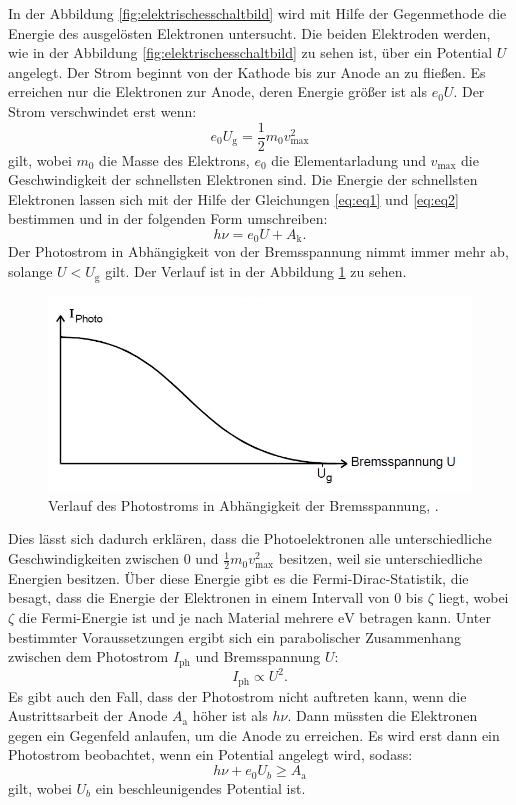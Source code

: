 In der Abbildung \ref{fig:elektrischesschaltbild} wird mit Hilfe der Gegenmethode die Energie des ausgelösten Elektronen untersucht. Die beiden Elektroden werden, wie in der Abbildung \ref{fig:elektrischesschaltbild} zu sehen ist, über ein Potential $U$ angelegt. Der Strom beginnt von der Kathode bis zur Anode an zu fließen. Es erreichen nur die Elektronen zur Anode, deren Energie größer ist als $e_0U$.
Der Strom verschwindet erst wenn:
\begin{equation}
\label{eq:eq2}
e_0U_\text{g} = \frac{1}{2}m_0v_\text{max}^2
\end{equation}
gilt, wobei $m_0$ die Masse des Elektrons, $e_0$ die Elementarladung und $v_\text{max}$ die Geschwindigkeit der schnellsten Elektronen sind. Die Energie der schnellsten Elektronen lassen sich mit der Hilfe der Gleichungen \ref{eq:eq1} und \ref{eq:eq2} bestimmen und in der folgenden Form umschreiben:
\begin{equation}
\label{eq:eq3}
h\nu = e_0U + A_\text{k}.
\end{equation}
Der Photostrom in Abhängigkeit von der Bremsspannung nimmt immer mehr ab, solange $U < U_\text{g}$ gilt. Der Verlauf ist in der Abbildung \ref{fig:photostrom} zu sehen. 
\begin{figure}[h!]
	\centering
	\includegraphics[width=0.7\linewidth]{Photostrom.jpg}
	\caption{Verlauf des Photostroms in Abhängigkeit der Bremsspannung, \cite[6]{anleitung500}.}
	\label{fig:photostrom}
\end{figure}
Dies lässt sich dadurch erklären, dass die Photoelektronen alle unterschiedliche Geschwindigkeiten zwischen $0$ und $\frac{1}{2}m_0v_\text{max}^2$ besitzen, weil sie unterschiedliche Energien besitzen. Über diese Energie gibt es die Fermi-Dirac-Statistik, die besagt, dass die Energie der Elektronen in einem Intervall von $0$ bis $\zeta$ liegt, wobei $\zeta$ die Fermi-Energie ist und je nach Material mehrere $\si{\electronvolt}$ betragen kann. 
Unter bestimmter Voraussetzungen ergibt sich ein parabolischer Zusammenhang zwischen dem Photostrom $I_\text{ph}$ und Bremsspannung $U$:
\begin{equation*}
I_\text{ph} \propto U^2.
\end{equation*}
Es gibt auch den Fall, dass der Photostrom nicht auftreten kann, wenn die Austrittsarbeit der Anode $A_\text{a}$ höher ist als $h \nu$. Dann müssten die Elektronen gegen ein Gegenfeld anlaufen, um die Anode zu erreichen. Es wird erst dann ein Photostrom beobachtet, wenn ein Potential angelegt wird, sodass:
\begin{equation*}
h \nu + e_0U_b \geq A_\text{a}
\end{equation*}
gilt, wobei $U_b$ ein beschleunigendes Potential ist. 